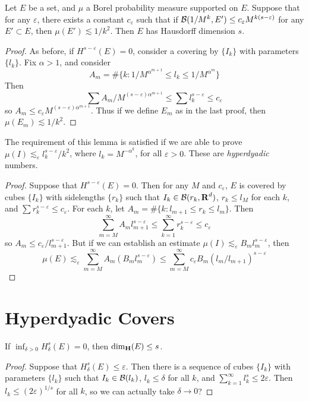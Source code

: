 \begin{theorem}
	Let $E$ be a set, and $\mu$ a Borel probability measure supported on $E$. Suppose that for any $\varepsilon$, there exists a constant $c_\varepsilon$ such that if $\operatorname{\mathcal{B}}(1/M^k,E') \leq c_\varepsilon M^{k(s-\varepsilon)}$ for any $E' \subset E$, then $\mu(E') \lesssim 1/k^2$. Then $E$ has Hausdorff dimension $s$.
\end{theorem}
\begin{proof}
	As before, if $H^{s-\varepsilon}(E) = 0$, consider a covering by $\{ I_k \}$ with parameters $\{ l_k \}$. Fix $\alpha > 1$, and consider
	\[ A_m = \# \{ k : 1/M^{\alpha^{m + 1}} \leq l_k \leq 1/M^{\alpha^m} \} \]
	Then
	\[ \sum A_m/M^{(s - \varepsilon) \alpha^{m+1}} \leq \sum l_k^{s - \varepsilon} \leq c_\varepsilon \]
	so $A_m \leq c_\varepsilon M^{(s - \varepsilon) \alpha^{m+1}}$. Thus if we define $E_m$ as in the last proof, then $\mu(E_m) \lesssim 1/k^2$.
\end{proof}

The requirement of this lemma is satisfied if we are able to prove $\mu(I) \lesssim_\varepsilon l_k^{s - \varepsilon}/k^2$, where $l_k = M^{- \alpha^k}$, for all $\varepsilon > 0$. These are \emph{hyperdyadic} numbers.

\begin{proof}
	Suppose that $H^{s-\varepsilon}(E) = 0$. Then for any $M$ and $c_\varepsilon$, $E$ is covered by cubes $\{ I_k \}$ with sidelengths $\{ r_k \}$ such that $I_k \in \operatorname{\mathcal{B}}(r_k,\operatorname{\mathbf{R}}^d)$, $r_k \leq l_M$ for each $k$, and $\sum r_k^{s - \varepsilon} \leq c_\varepsilon$. For each $k$, let $A_m = \# \{ k: l_{m+1} \leq r_k \leq l_m \}$. Then
	\[ \sum_{m = M}^\infty A_m l_{m+1}^{s - \varepsilon} \leq \sum_{k = 1}^\infty r_k^{s - \varepsilon} \leq c_\varepsilon \]
	so $A_m \leq c_\varepsilon / l_{m+1}^{s-\varepsilon}$. But if we can establish an estimate $\mu(I) \lesssim_\varepsilon B_m l_m^{s - \varepsilon}$, then 
	\[ \mu(E) \lesssim_\varepsilon \sum_{m = M}^\infty A_m (B_m l_m^{s - \varepsilon}) \leq \sum_{m = M}^\infty c_\varepsilon B_m (l_m/l_{m+1})^{s - \varepsilon} \]
\end{proof}

\section{Hyperdyadic Covers}

\begin{theorem}
	If $\inf_{\delta > 0} H^s_\delta(E) = 0$, then $\operatorname{\dim_{\mathbf{H}}}(E) \leq s$.
\end{theorem}
\begin{proof}
	Suppose that $H^s_\delta(E) \leq \varepsilon$. Then there is a sequence of cubes $\{ I_k \}$ with parameters $\{ l_k \}$ such that $I_k \in \operatorname{\mathcal{B}}(l_k)$, $l_k \leq \delta$ for all $k$, and $\sum_{k = 1}^\infty l_k^s \leq 2\varepsilon$. Then $l_k \leq (2\varepsilon)^{1/s}$ for all $k$, so we can actually take $\delta \to 0$?
\end{proof}


